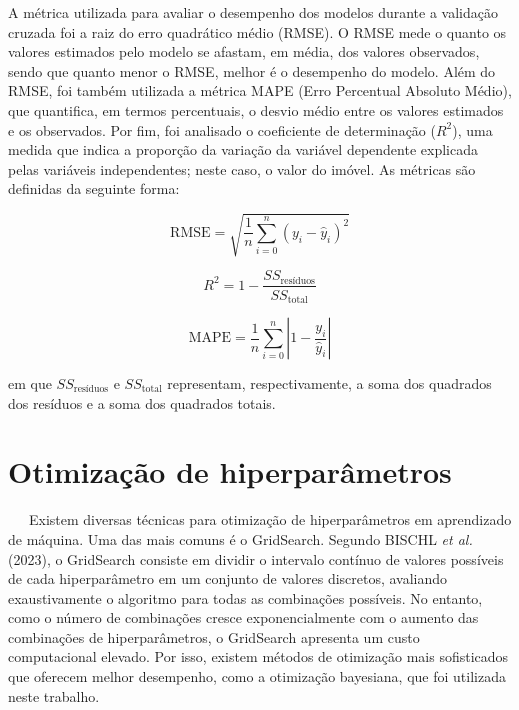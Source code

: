 \documentclass[
  12pt,
  a4paper,
]{scrreprt}
\begin{document}
\vspace{12pt}

A métrica utilizada para avaliar o desempenho dos modelos durante a
validação cruzada foi a raiz do erro quadrático médio (RMSE). O RMSE
mede o quanto os valores estimados pelo modelo se afastam, em média, dos
valores observados, sendo que quanto menor o RMSE, melhor é o desempenho
do modelo. Além do RMSE, foi também utilizada a métrica MAPE (Erro
Percentual Absoluto Médio), que quantifica, em termos percentuais, o
desvio médio entre os valores estimados e os observados. Por fim, foi
analisado o coeficiente de determinação (\(R^2\)), uma medida que indica
a proporção da variação da variável dependente explicada pelas variáveis
independentes; neste caso, o valor do imóvel. As métricas são definidas
da seguinte forma:

\begin{figure}

\begin{minipage}{0.33\linewidth}
\[
\text{RMSE} = \sqrt{\dfrac{1}{n} \sum_{i = 0}^n (y_i - \hat y_i)^2}
\]\end{minipage}%
%
\begin{minipage}{0.33\linewidth}
\[
R^2 = 1 - \dfrac{SS_{\text{resíduos}}}{SS_{\text{total}}}
\]\end{minipage}%
%
\begin{minipage}{0.33\linewidth}
\[
\text{MAPE} = \frac{1}{n} \sum_{i=0}^n \left|1 - \frac{y_i}{\hat y_i}\right|
\]\end{minipage}%

\end{figure}%

\hfill\break
em que \(SS_{\text{resíduos}}\) e \(SS_{\text{total}}\) representam,
respectivamente, a soma dos quadrados dos resíduos e a soma dos
quadrados totais.

\section{Otimização de
hiperparâmetros}\label{otimizauxe7uxe3o-de-hiperparuxe2metros}

~~~Existem diversas técnicas para otimização de hiperparâmetros em
aprendizado de máquina. Uma das mais comuns é o GridSearch. Segundo
BISCHL \emph{et al.} (2023), o GridSearch consiste em dividir o
intervalo contínuo de valores possíveis de cada hiperparâmetro em um
conjunto de valores discretos, avaliando exaustivamente o algoritmo para
todas as combinações possíveis. No entanto, como o número de combinações
cresce exponencialmente com o aumento das combinações de
hiperparâmetros, o GridSearch apresenta um custo computacional elevado.
Por isso, existem métodos de otimização mais sofisticados que oferecem
melhor desempenho, como a otimização bayesiana, que foi utilizada neste
trabalho.
\end{document}
